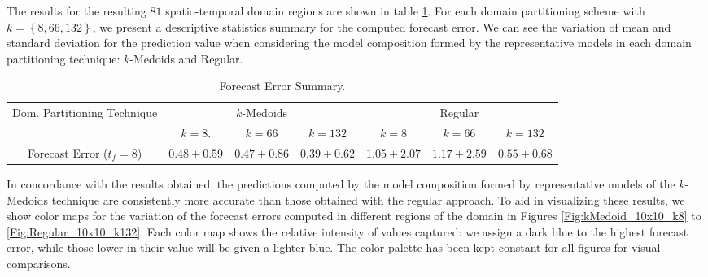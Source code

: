 The results for the resulting $81$ spatio-temporal domain regions are shown in table \ref{Table:Query10x10_kMedoids_Regular_StatSummary}. For each domain partitioning scheme with $k = \left\{8, 66, 132 \right\}$, we present a descriptive statistics summary for the computed forecast error. We can see the variation of mean and standard deviation for the prediction value when considering the model composition formed by the representative models in each domain partitioning technique: $k$-Medoids and Regular.

\begin{table}[h!]
	\centering
	\tiny
	\begin{tabular}{|c|c|c|c|c|c|c|}
		\hline
		\multirow{2}{*}{Dom. Partitioning Technique} & \multicolumn{3}{c|}{$k$-Medoids} & \multicolumn{3}{c|}{Regular} \\
		\cline{2-7}
		& $k = 8$. & $k = 66$ & $k = 132$ & $k = 8$ & $k = 66$ & $k = 132$ \\
		\cline{2-7}
		\hline
		Forecast Error ($t_{f}=8$) & $0.48 \pm 0.59$ & $0.47 \pm 0.86$ & $0.39 \pm 0.62$ & $1.05 \pm 2.07$ & $1.17 \pm 2.59$ & $0.55 \pm 0.68$	 \\
		\hline
	\end{tabular}
	\caption{Forecast Error Summary.}
	\label{Table:Query10x10_kMedoids_Regular_StatSummary}
\end{table}

In concordance with the results obtained, the predictions computed by the model composition formed by representative models of the $k$-Medoids technique are consistently more accurate than those obtained with the regular approach. To aid in visualizing these results, we show color maps for the variation of the forecast errors computed in different regions of the domain in Figures \ref{Fig:kMedoid_10x10_k8} to \ref{Fig:Regular_10x10_k132}. Each color map shows the relative intensity of values captured: we assign a dark blue to the highest forecast error, while those lower in their value will be given a lighter blue. The color palette has been kept constant for all figures for visual comparisons.

